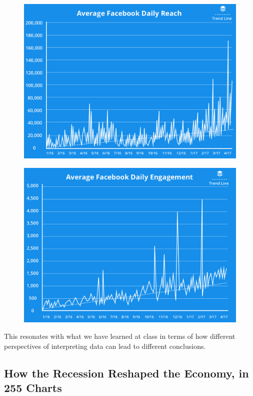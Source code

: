 \documentclass[]{book}
\theoremstyle{definition}
\theoremstyle{definition}
\theoremstyle{definition}
\theoremstyle{remark}
\begin{document}
\begin{figure}
\centering
\includegraphics{images/average-facebook-reach.png}
\caption{}
\end{figure}

\begin{figure}
\centering
\includegraphics{images/average-facebook-daily-reach.png}
\caption{}
\end{figure}

This resonates with what we have learned at class in terms of how
different perspectives of interpreting data can lead to different
conclusions.

\subsection{How the Recession Reshaped the Economy, in 255
Charts}\label{how-the-recession-reshaped-the-economy-in-255-charts}
\end{document}
